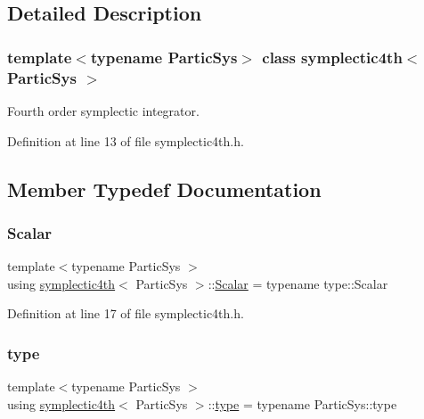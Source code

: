 \subsection{Detailed Description}
\subsubsection*{template$<$typename Partic\+Sys$>$\newline
class symplectic4th$<$ Partic\+Sys $>$}

Fourth order symplectic integrator. 

Definition at line 13 of file symplectic4th.\+h.



\subsection{Member Typedef Documentation}
\mbox{\label{classsymplectic4th_a272a5a2bb16a90a7ebdad0335a2fac9b}} 
\subsubsection{\texorpdfstring{Scalar}{Scalar}}
{\footnotesize\ttfamily template$<$typename Partic\+Sys $>$ \\
using \mbox{\hyperlink{classsymplectic4th}{symplectic4th}}$<$ Partic\+Sys $>$\+::\mbox{\hyperlink{classsymplectic4th_a272a5a2bb16a90a7ebdad0335a2fac9b}{Scalar}} =  typename type\+::\+Scalar}



Definition at line 17 of file symplectic4th.\+h.

\mbox{\label{classsymplectic4th_a5af1033b30e95ca0d08ee8f3c0adabc2}} 
\subsubsection{\texorpdfstring{type}{type}}
{\footnotesize\ttfamily template$<$typename Partic\+Sys $>$ \\
using \mbox{\hyperlink{classsymplectic4th}{symplectic4th}}$<$ Partic\+Sys $>$\+::\mbox{\hyperlink{classsymplectic4th_a5af1033b30e95ca0d08ee8f3c0adabc2}{type}} =  typename Partic\+Sys\+::type}



